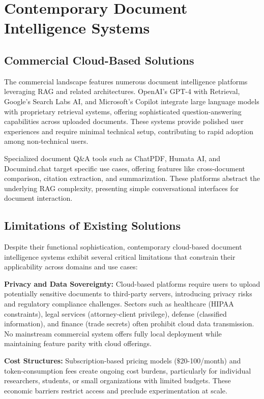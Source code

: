 \section{Contemporary Document Intelligence Systems}

\subsection{Commercial Cloud-Based Solutions}

The commercial landscape features numerous document intelligence platforms leveraging RAG and related architectures. OpenAI's GPT-4 with Retrieval, Google's Search Labs AI, and Microsoft's Copilot integrate large language models with proprietary retrieval systems, offering sophisticated question-answering capabilities across uploaded documents. These systems provide polished user experiences and require minimal technical setup, contributing to rapid adoption among non-technical users.

Specialized document Q\&A tools such as ChatPDF, Humata AI, and Documind.chat target specific use cases, offering features like cross-document comparison, citation extraction, and summarization. These platforms abstract the underlying RAG complexity, presenting simple conversational interfaces for document interaction.

\subsection{Limitations of Existing Solutions}

Despite their functional sophistication, contemporary cloud-based document intelligence systems exhibit several critical limitations that constrain their applicability across domains and use cases:

\textbf{Privacy and Data Sovereignty:} Cloud-based platforms require users to upload potentially sensitive documents to third-party servers, introducing privacy risks and regulatory compliance challenges. Sectors such as healthcare (HIPAA constraints), legal services (attorney-client privilege), defense (classified information), and finance (trade secrets) often prohibit cloud data transmission. No mainstream commercial system offers fully local deployment while maintaining feature parity with cloud offerings.

\textbf{Cost Structures:} Subscription-based pricing models ($\$$20-100/month) and token-consumption fees create ongoing cost burdens, particularly for individual researchers, students, or small organizations with limited budgets. These economic barriers restrict access and preclude experimentation at scale.

